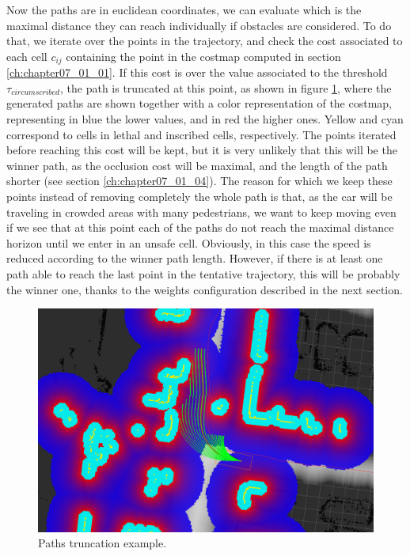 Now the paths are in euclidean coordinates, we can evaluate which is the maximal distance they can reach individually if obstacles are considered. To do that, we iterate over the points in the trajectory, and check the cost associated to each cell $c_{ij}$ containing the point in the costmap computed in section \ref{ch:chapter07_01_01}. If this cost is over the value associated to the threshold $\tau_{circumscribed}$, the path is truncated at this point, as shown in figure \ref{fig:cp07_path_truncation}, where the generated paths are shown together with a color representation of the costmap, representing in blue the lower values, and in red the higher ones. Yellow and cyan correspond to cells in lethal and inscribed cells, respectively. The points iterated before reaching this cost will be kept, but it is very unlikely that this will be the winner path, as the occlusion cost will be maximal, and the length of the path shorter (see section \ref{ch:chapter07_01_04}). The reason for which we keep these points instead of removing completely the whole path is that, as the car will be traveling in crowded areas with many pedestrians, we want to keep moving even if we see that at this point each of the paths do not reach the maximal distance horizon until we enter in an unsafe cell. Obviously, in this case the speed is reduced according to the winner path length. However, if there is at least one path able to reach the last point in the tentative trajectory, this will be probably the winner one, thanks to the weights configuration described in the next section.

\begin{figure}[h!]
\centering
\includegraphics{example15}
\caption{Paths truncation example.}\label{fig:cp07_path_truncation}
\end{figure}

